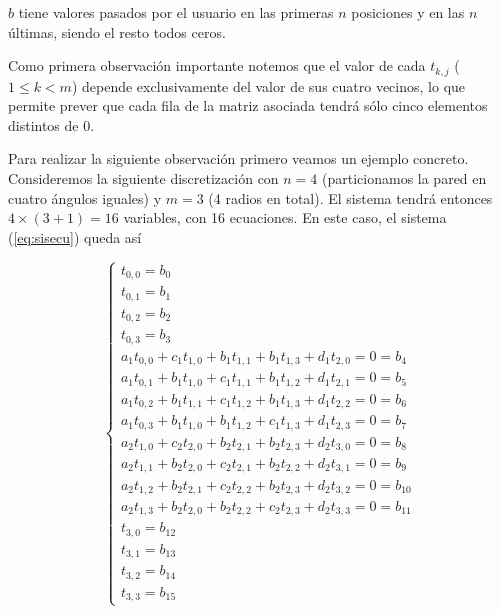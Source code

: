 $b$ tiene valores pasados por el usuario en las primeras $n$ posiciones y en las $n$ últimas, siendo el resto todos ceros.

Como primera observación importante notemos que el valor de cada $t_{k,j}$ ($1\leq k < m$) depende exclusivamente del valor de sus cuatro vecinos, lo que permite prever que cada fila de la matriz asociada tendrá sólo cinco elementos distintos de 0.

Para realizar la siguiente observación primero veamos un ejemplo concreto. Consideremos la siguiente discretización con $n = 4$ (particionamos la pared en cuatro ángulos iguales) y $m = 3$ (4 radios en total). El sistema tendrá entonces $4\times (3+1) = 16$ variables, con 16 ecuaciones. En este caso, el sistema (\ref{eq:sisecu}) queda así

\begin{equation}
\label{ej16x16}
  \left\lbrace
  \begin{array}{l}
     t_{0,0} = b_0 \\
     t_{0,1} = b_1 \\
     t_{0,2} = b_2 \\
     t_{0,3} = b_3 \\
		 a_1 t_{0,0} + c_1 t_{1,0} + b_1 t_{1, 1} + b_1 t_{1, 3} + d_1 t_{2,0} 		= 0 = b_{4}	\\
		 a_1 t_{0,1} + b_1 t_{1,0} + c_1 t_{1,1} + b_1 t_{1,2} + d_1 t_{2,1} 		 	= 0 = b_{5}	\\
	   a_1 t_{0,2} + b_1 t_{1,1} + c_1 t_{1,2} + b_1 t_{1,3} + d_1 t_{2,2} 			= 0 = b_{6}	\\
		 a_1 t_{0,3} + b_1 t_{1,0} + b_1 t_{1,2} + c_1 t_{1,3} + d_1 t_{2,3} 			= 0 = b_{7}	\\
		 a_2 t_{1,0} + c_2 t_{2,0} + b_2 t_{2,1} + b_2 t_{2,3} + d_2 t_{3,0}			= 0 = b_{8}	\\
		 a_2 t_{1,1} + b_2 t_{2,0} + c_2 t_{2,1} + b_2 t_{2,2} + d_2 t_{3,1} 		 	= 0 = b_{9}	\\
	   a_2 t_{1,2} + b_2 t_{2,1} + c_2 t_{2,2} + b_2 t_{2,3} + d_2 t_{3,2} 			= 0 = b_{10}	\\
		 a_2 t_{1,3} + b_2 t_{2,0} + b_2 t_{2,2} + c_2 t_{2,3} + d_2 t_{3,3} 			= 0 = b_{11}	\\
     t_{3,0} = b_{12} \\
     t_{3,1} = b_{13} \\
     t_{3,2} = b_{14} \\
     t_{3,3} = b_{15}     		 
  \end{array}
  \right.
\end{equation}

